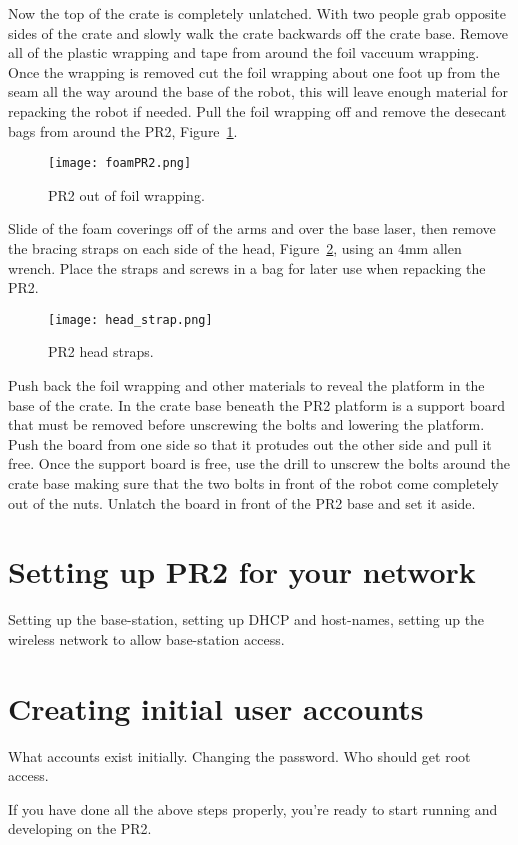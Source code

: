 Now the top of the crate is completely unlatched. With two people grab opposite
sides of the crate and slowly walk the crate backwards off the crate
base. Remove all of the plastic wrapping and tape from around the foil vaccuum
wrapping. Once the wrapping is removed cut the foil wrapping about one foot up
from the seam all the way around the base of the robot, this will leave enough
material for repacking the robot if needed. Pull the foil wrapping off and
remove the desecant bags from around the PR2, Figure~\ref{fig:foamPR2}.

\begin{figure}[h]
\centering
\texttt{[image: foamPR2.png]}
\caption{PR2 out of foil wrapping.}
\label{fig:foamPR2}
\end{figure}

Slide of the foam coverings off of the arms and over the base laser, then remove
the bracing straps on each side of the head, Figure~\ref{fig:head_straps}, using
an 4mm allen wrench. Place the straps and screws in a bag for later use when
repacking the PR2.

\begin{figure}[h]
\centering
\texttt{[image: head\_strap.png]}
\caption{PR2 head straps.}
\label{fig:head_straps}
\end{figure}

Push back the foil wrapping and other materials to reveal the platform in the
base of the crate. In the crate base beneath the PR2 platform is a support board
that must be removed before unscrewing the bolts and lowering the platform. Push
the board from one side so that it protudes out the other side and pull it
free. Once the support board is free, use the drill to unscrew the bolts around
the crate base making sure that the two bolts in front of the robot come
completely out of the nuts. Unlatch the board in front of the PR2 base and set
it aside.




\section{Setting up PR2 for your network}
Setting up the base-station, setting up DHCP and host-names, setting up the wireless network to allow base-station access.
\section{Creating initial user accounts}
What accounts exist initially.  Changing the password.  Who should get root access.

If you have done all the above steps properly, you're ready to start running and developing on the PR2.
